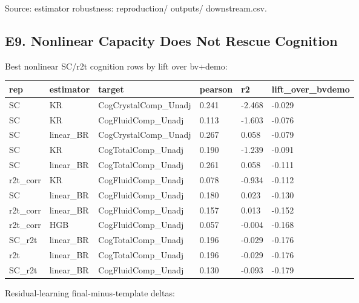 Source: estimator robustness: reproduction/ outputs/ downstream.csv.

\subsection{E9. Nonlinear Capacity Does Not Rescue Cognition}\label{e9-nonlinear-capacity-does-not-rescue-cognition}

Best nonlinear SC/r2t cognition rows by lift over bv+demo:

{\def\LTcaptype{none} %
\begin{longtable}[]{@{}llllll@{}}
\toprule\noalign{}
rep & estimator & target & pearson & r2 & lift\_over\_bvdemo \\
\midrule\noalign{}
\endhead
\bottomrule\noalign{}
\endlastfoot
SC & KR & CogCrystalComp\_Unadj & 0.241 & -2.468 & -0.029 \\
SC & KR & CogFluidComp\_Unadj & 0.113 & -1.603 & -0.076 \\
SC & linear\_BR & CogCrystalComp\_Unadj & 0.267 & 0.058 & -0.079 \\
SC & KR & CogTotalComp\_Unadj & 0.190 & -1.239 & -0.091 \\
SC & linear\_BR & CogTotalComp\_Unadj & 0.261 & 0.058 & -0.111 \\
r2t\_corr & KR & CogFluidComp\_Unadj & 0.078 & -0.934 & -0.112 \\
SC & linear\_BR & CogFluidComp\_Unadj & 0.180 & 0.023 & -0.130 \\
r2t\_corr & linear\_BR & CogFluidComp\_Unadj & 0.157 & 0.013 & -0.152 \\
r2t\_corr & HGB & CogFluidComp\_Unadj & 0.057 & -0.004 & -0.168 \\
SC\_r2t & linear\_BR & CogTotalComp\_Unadj & 0.196 & -0.029 & -0.176 \\
r2t & linear\_BR & CogTotalComp\_Unadj & 0.196 & -0.029 & -0.176 \\
SC\_r2t & linear\_BR & CogFluidComp\_Unadj & 0.130 & -0.093 & -0.179 \\
\end{longtable}
}

Residual-learning final-minus-template deltas:

